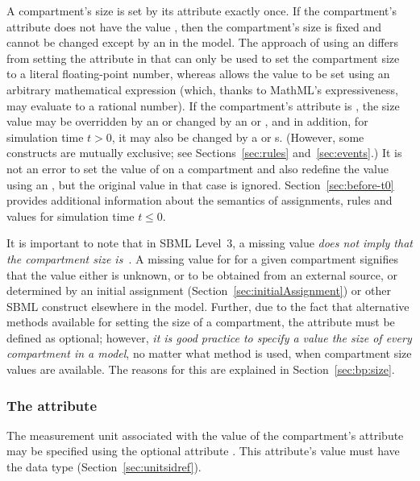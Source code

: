 A compartment's size is set by its  attribute exactly
once.  If the compartment's attribute  does not
have the value , then the compartment's size is fixed
and cannot be changed except by an \InitialAssignment in the
model.  The approach of using an \InitialAssignment differs from
setting the  attribute in that  can only
be used to set the compartment size to a literal floating-point
number, whereas \InitialAssignment allows the value to be set
using an arbitrary mathematical expression (which, thanks to
MathML's expressiveness, may evaluate to a rational number).  If
the compartment's  attribute is , the
size value may be overridden by an \InitialAssignment or changed
by an \AssignmentRule or \AlgebraicRule, and in addition, for
simulation time $t > 0$, it may also be changed by a \RateRule or
\Event{}s.  (However, some constructs are mutually exclusive; see
Sections~\ref{sec:rules} and~\ref{sec:events}.)  It is not an
error to set the value of  on a compartment and also
redefine the value using an \InitialAssignment, but the original
 value in that case is ignored.
Section~\ref{sec:before-t0} provides additional information about
the semantics of assignments, rules and values for simulation time
$t \leq 0$.

It is important to note that in SBML Level~3, a missing
 value \emph{does not imply that the compartment size
  is~}.  A missing value for  for a given
compartment signifies that the value either is unknown, or to be
obtained from an external source, or determined by an initial
assignment (Section~\ref{sec:initialAssignment}) or other SBML
construct elsewhere in the model.  Further, due to the fact that
alternative methods available for setting the size of a
compartment, the  attribute must be defined as
optional; however, \emph{it is good practice to specify a value
  the size of every compartment in a model}, no matter what method
is used, when compartment size values are available.  The reasons
for this are explained in Section~\ref{sec:bp:size}.


\subsubsection{The  attribute}
\label{sec:compartment-units}

The measurement unit associated with the value of the
compartment's  attribute may be specified using the
optional attribute .  This attribute's value must
have the data type 
(Section~\ref{sec:unitsidref}).

